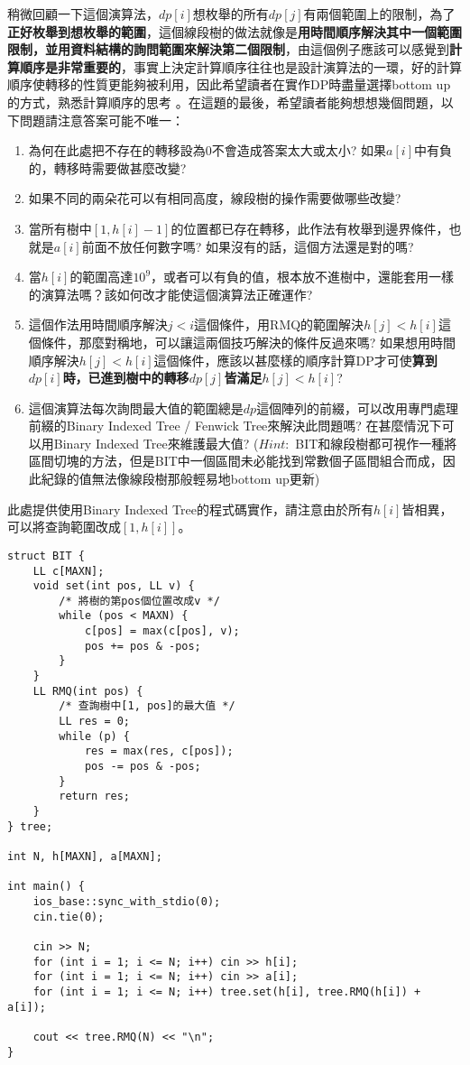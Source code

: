稍微回顧一下這個演算法，$dp[i]$想枚舉的所有$dp[j]$有兩個範圍上的限制，為了\textbf{正好枚舉到想枚舉的範圍}，這個線段樹的做法就像是\textbf{用時間順序解決其中一個範圍限制，並用資料結構的詢問範圍來解決第二個限制}，由這個例子應該可以感覺到\textbf{計算順序是非常重要的}，事實上決定計算順序往往也是設計演算法的一環，好的計算順序使轉移的性質更能夠被利用，因此希望讀者在實作DP時盡量選擇bottom up的方式，熟悉計算順序的思考
。在這題的最後，希望讀者能夠想想幾個問題，以下問題請注意答案可能不唯一：
\begin{enumerate}
\item 為何在此處把不存在的轉移設為$0$不會造成答案太大或太小? 如果$a[i]$中有負的，轉移時需要做甚麼改變?
\item 如果不同的兩朵花可以有相同高度，線段樹的操作需要做哪些改變?
\item 當所有樹中$[1, h[i] - 1]$的位置都已存在轉移，此作法有枚舉到邊界條件，也就是$a[i]$前面不放任何數字嗎? 如果沒有的話，這個方法還是對的嗎?
\item 當$h[i]$的範圍高達$10^9$，或者可以有負的值，根本放不進樹中，還能套用一樣的演算法嗎？該如何改才能使這個演算法正確運作?
\item 這個作法用時間順序解決$j < i$這個條件，用RMQ的範圍解決$h[j] < h[i]$這個條件，那麼對稱地，可以讓這兩個技巧解決的條件反過來嗎? 如果想用時間順序解決$h[j] < h[i]$這個條件，應該以甚麼樣的順序計算DP才可使\textbf{算到$dp[i]$時，已進到樹中的轉移$dp[j]$皆滿足$h[j] < h[i]$}?
\item 這個演算法每次詢問最大值的範圍總是$dp$這個陣列的前綴，可以改用專門處理前綴的Binary Indexed Tree / Fenwick Tree來解決此問題嗎? 在甚麼情況下可以用Binary Indexed Tree來維護最大值? ($Hint:$ BIT和線段樹都可視作一種將區間切塊的方法，但是BIT中一個區間未必能找到常數個子區間組合而成，因此紀錄的值無法像線段樹那般輕易地bottom up更新)
\end{enumerate}
此處提供使用Binary Indexed Tree的程式碼實作，請注意由於所有$h[i]$皆相異，可以將查詢範圍改成$[1, h[i]]$。
\begin{lstlisting}[caption=使用Binary Indexed Tree解Flower]
struct BIT {
	LL c[MAXN];
	void set(int pos, LL v) {
		/* 將樹的第pos個位置改成v */
		while (pos < MAXN) {
			c[pos] = max(c[pos], v);
			pos += pos & -pos;
		}
	}
	LL RMQ(int pos) {
		/* 查詢樹中[1, pos]的最大值 */
		LL res = 0;
		while (p) {
			res = max(res, c[pos]);
			pos -= pos & -pos;
		}
		return res;
	}
} tree;

int N, h[MAXN], a[MAXN];

int main() {
	ios_base::sync_with_stdio(0);
	cin.tie(0);

	cin >> N;
	for (int i = 1; i <= N; i++) cin >> h[i];
	for (int i = 1; i <= N; i++) cin >> a[i];
	for (int i = 1; i <= N; i++) tree.set(h[i], tree.RMQ(h[i]) + a[i]);

	cout << tree.RMQ(N) << "\n";
}
\end{lstlisting}

